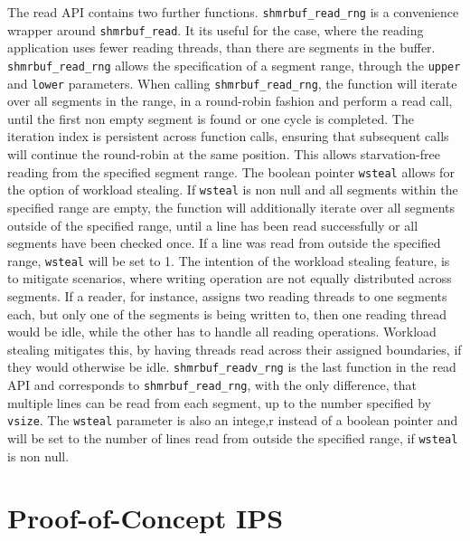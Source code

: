 \par
The read API contains two further functions. \texttt{shmrbuf\_read\_rng} is a convenience wrapper around \texttt{shmrbuf\_read}. It its useful for the case, where the reading
application uses fewer reading threads, than there are segments in the buffer. \texttt{shmrbuf\_read\_rng} allows the specification of a segment range, through the \texttt{upper}
and \texttt{lower} parameters. When calling \texttt{shmrbuf\_read\_rng}, the function will iterate over all segments in the range, in a round-robin fashion and perform a read call, until the first non empty segment is found or one cycle is completed.
The iteration index is persistent across function calls, ensuring that subsequent calls will continue the round-robin at the same position. This allows
starvation-free reading from the specified segment range. The boolean pointer \texttt{wsteal} allows for the option of workload stealing.
If \texttt{wsteal} is non null and all segments within the specified range are empty, the function will additionally iterate over all
segments outside of the specified range, until a line has been read successfully or all segments have been checked once. If a line was read from 
outside the specified range, \texttt{wsteal} will be set to 1. The intention of the workload stealing feature, is to mitigate scenarios,
where writing operation are not equally distributed across segments. If a reader, for instance, assigns two reading threads to one segments each,
but only one of the segments is being written to, then one reading thread would be idle, while the other has to handle all reading operations.
Workload stealing mitigates this, by having threads read across their assigned boundaries, if they would otherwise be idle.
\texttt{shmrbuf\_readv\_rng} is the last function in the read API and corresponds to \texttt{shmrbuf\_read\_rng}, with the only difference,
that multiple lines can be read from each segment, up to the number specified by \texttt{vsize}. The \texttt{wsteal} parameter is
also an intege,r instead of a boolean pointer and will be set to the number of lines read from outside the specified range, if \texttt{wsteal} is non null.

\section{Proof-of-Concept IPS}

